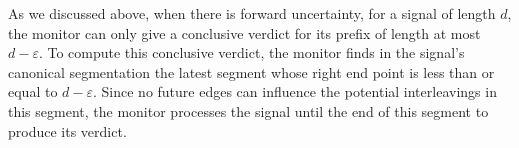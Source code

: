 \documentclass[iicol,lineno]{sn-jnl}
\newcommand{\?}{\text{?}}
\begin{document}
	As we discussed above, when there is forward uncertainty, for a signal of length $d$, the monitor can only give a conclusive verdict for its prefix of length at most $d-\varepsilon$.
	To compute this conclusive verdict, the monitor finds in the signal's canonical segmentation the latest segment whose right end point is less than or equal to $d-\varepsilon$.
	Since no future edges can influence the potential interleavings in this segment, the monitor processes the signal until the end of this segment to produce its verdict.
	
\end{document}
